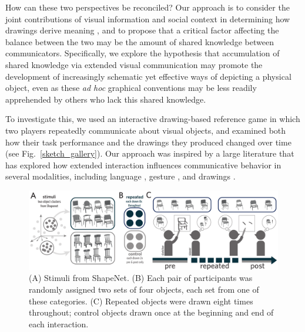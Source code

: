 \documentclass[10pt,letterpaper]{article}
\begin{document}
How can these two perspectives be reconciled?
Our approach is to consider the joint contributions of visual information and social context in determining how drawings derive meaning \cite{abell2009canny}, and to propose that a critical factor affecting the balance between the two may be the amount of shared knowledge between communicators.
Specifically, we explore the hypothesis that accumulation of shared knowledge via extended visual communication may promote the development of increasingly schematic yet effective ways of depicting a physical object, even as these \textit{ad hoc} graphical conventions may be less readily apprehended by others who lack this shared knowledge.

To investigate this, we used an interactive drawing-based reference game in which two players repeatedly communicate about visual objects, and examined both how their task performance and the drawings they produced changed over time (see Fig.~\ref{sketch_gallery}).
Our approach was inspired by a large literature that has explored how extended interaction influences communicative behavior in several modalities, including language \cite{krauss1964changes,ClarkWilkesGibbs86_ReferringCollaborative,HawkinsFrankGoodman17_ConventionFormation}, gesture \cite{goldin1996silence,fay2014creating}, and drawings \cite{garrod_foundations_2007,galantucci2005experimental,fay2010interactive}.

\begin{figure}
\begin{center}
\includegraphics[width=0.86\linewidth]{figures/task_stimuli.pdf}
\caption{(A) Stimuli from ShapeNet. (B) Each pair of participants was randomly assigned two sets of four objects, each set from one of these categories. (C) Repeated objects were drawn eight times throughout; control objects drawn once at the beginning and end of each interaction.}
\label{task_stimuli}
\vspace{-1em}
\end{center}
\end{figure}

\end{document}
